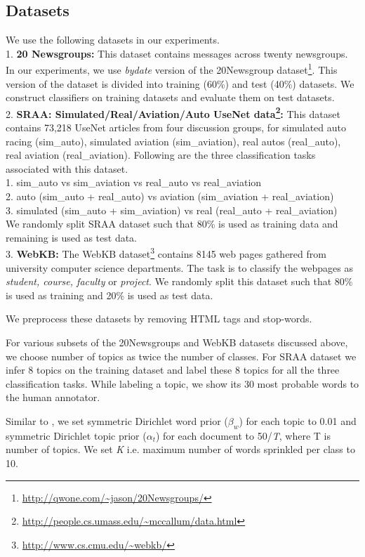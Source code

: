 \documentclass[11pt]{article}
\begin{document}
\subsection{Datasets}
We use the following datasets in our experiments.\\
1. \textbf{20 Newsgroups:}  This dataset contains messages across twenty newsgroups. In our experiments, we use \textit{bydate} version of the 20Newsgroup dataset\footnote{\url{http://qwone.com/~jason/20Newsgroups/}}.  This version of the dataset is divided into training (60\%) and test (40\%) datasets. We construct classifiers on training datasets and evaluate them on test datasets.\\
2. \textbf{SRAA: Simulated/Real/Aviation/Auto UseNet data\footnote{\url{http://people.cs.umass.edu/~mccallum/data.html}}:} This dataset contains 73,218 UseNet articles from four discussion groups, for simulated auto racing (sim\_auto), simulated aviation (sim\_aviation), real autos (real\_auto), real aviation (real\_aviation). Following are the three classification tasks associated with this dataset.\\
1. sim\_auto vs sim\_aviation vs real\_auto vs real\_aviation\\
2. auto (sim\_auto + real\_auto) vs aviation (sim\_aviation + real\_aviation)\\
3. simulated (sim\_auto + sim\_aviation) vs real (real\_auto + real\_aviation)\\
We randomly split SRAA dataset such that 80\% is used as training data and remaining is used as test data.\\
3. \textbf{WebKB:} The WebKB dataset\footnote{\url{http://www.cs.cmu.edu/~webkb/}}  contains 8145 web pages gathered from university computer science departments. The task is to classify the webpages as \textit{student, course, faculty} or \textit{project}. We randomly split this dataset such that 80\% is used as training and 20\% is used as test data.

We preprocess these datasets by removing HTML tags and stop-words.

For various subsets of the 20Newsgroups and WebKB datasets discussed above, we choose number of topics as twice the number of classes.  For SRAA dataset we infer 8 topics on the training dataset and label these 8 topics for all the three classification tasks. While labeling a topic, we show its 30 most probable words to the human annotator.

Similar to \cite{Griffiths:Finding}, we set symmetric Dirichlet word prior ($\beta_w$) for each topic to 0.01 and symmetric Dirichlet topic prior ($\alpha_t$) for each document to 50/\textit{T}, where T is number of topics. We set \textit{K} i.e. maximum number of words sprinkled per class to 10.
\end{document}
